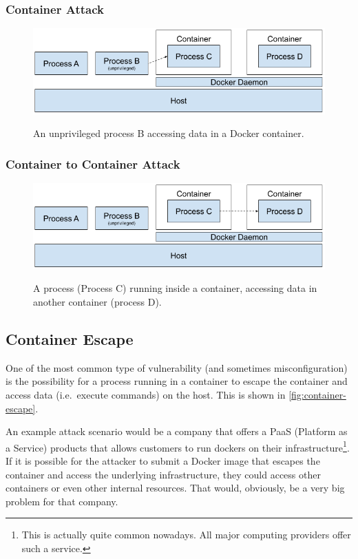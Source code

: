 \subsubsection*{Container Attack}
\begin{figure}[ht]
    \centering
    \includegraphics[width=.9\linewidth]{resources/images/attack-scenario-2.png}
    \caption{}\label{fig:container-attack}
    \medskip
    \small
    An unprivileged process B accessing data in a Docker container.
\end{figure}

\subsubsection*{Container to Container Attack}
\begin{figure}[ht]
    \centering
    \includegraphics[width=.9\linewidth]{resources/images/attack-scenario-4.png}
    \caption{}\label{fig:container-to-container-attack}
    \medskip
    \small
    A process (Process C) running inside a container, accessing data in another container (process D).
\end{figure}

\subsection{Container Escape}
One of the most common type of vulnerability (and sometimes misconfiguration) is the possibility for a process running in a container to escape the container and access data (i.e.\ execute commands) on the host. This is shown in \autoref{fig:container-escape}.

\hfill

An example attack scenario would be a company that offers a PaaS (Platform as a Service) products that allows customers to run dockers on their infrastructure\footnote{This is actually quite common nowadays. All major computing providers offer such a service.}. If it is possible for the attacker to submit a Docker image that escapes the container and access the underlying infrastructure, they could access other containers or even other internal resources. That would, obviously, be a very big problem for that company.

